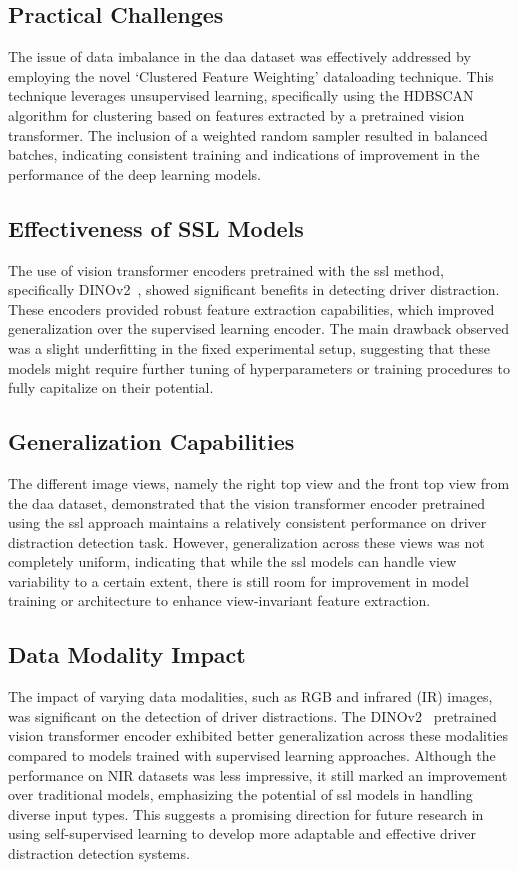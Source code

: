 \subsection{Practical Challenges}
The issue of data imbalance in the \gls{daa} dataset was effectively addressed by employing the novel `Clustered Feature Weighting' dataloading technique. This technique leverages unsupervised learning, specifically using the HDBSCAN algorithm for clustering based on features extracted by a pretrained vision transformer. The inclusion of a weighted random sampler resulted in balanced batches, indicating consistent training and indications of improvement in the performance of the deep learning models.

\subsection{Effectiveness of SSL Models}
The use of vision transformer encoders pretrained with the \gls{ssl} method, specifically DINOv2~\citep{dinov2_oquab2023dinov2}, showed significant benefits in detecting driver distraction. These encoders provided robust feature extraction capabilities, which improved generalization over the supervised learning encoder. The main drawback observed was a slight underfitting in the fixed experimental setup, suggesting that these models might require further tuning of hyperparameters or training procedures to fully capitalize on their potential.

\subsection{Generalization Capabilities}
The different image views, namely the right top view and the front top view from the \gls{daa} dataset, demonstrated that the vision transformer encoder pretrained using the \gls{ssl} approach maintains a relatively consistent performance on driver distraction detection task. However, generalization across these views was not completely uniform, indicating that while the \gls{ssl} models can handle view variability to a certain extent, there is still room for improvement in model training or architecture to enhance view-invariant feature extraction.

\subsection{Data Modality Impact}
The impact of varying data modalities, such as RGB and infrared (IR) images, was significant on the detection of driver distractions. The DINOv2~\citep{dinov2_oquab2023dinov2} pretrained vision transformer encoder exhibited better generalization across these modalities compared to models trained with supervised learning approaches. Although the performance on NIR datasets was less impressive, it still marked an improvement over traditional models, emphasizing the potential of \gls{ssl} models in handling diverse input types. This suggests a promising direction for future research in using self-supervised learning to develop more adaptable and effective driver distraction detection systems.

